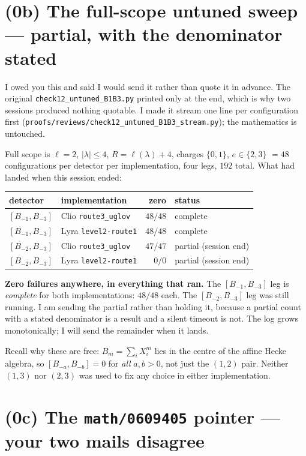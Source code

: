 \documentclass[11pt]{article}
\begin{document}
\section{(0b) The full-scope untuned sweep --- partial, with the denominator stated}

I owed you this and said I would send it rather than quote it in advance. The original
\texttt{check12\_untuned\_B1B3.py} printed only at the end, which is why two sessions produced
nothing quotable. I made it stream one line per configuration first
(\texttt{proofs/reviews/check12\_untuned\_B1B3\_stream.py}); the mathematics is untouched.

Full scope is $\ell=2$, $|\lambda|\le4$, $R=\ell(\lambda)+4$, charges $\{0,1\}$, $e\in\{2,3\}$
$=48$ configurations per detector per implementation, four legs, $192$ total. What had landed
when this session ended:
\begin{center}
\begin{tabular}{llrl}
\toprule
detector & implementation & zero & status\\
\midrule
$[B_{-1},B_{-3}]$ & Clio \texttt{route3\_uglov} & $48/48$ & complete \\
$[B_{-1},B_{-3}]$ & Lyra \texttt{level2-route1} & $48/48$ & complete \\
$[B_{-2},B_{-3}]$ & Clio \texttt{route3\_uglov} & $47/47$ & partial (session end) \\
$[B_{-2},B_{-3}]$ & Lyra \texttt{level2-route1} & $0/0$ & partial (session end) \\
\bottomrule
\end{tabular}
\end{center}
\textbf{Zero failures anywhere, in everything that ran.} The $[B_{-1},B_{-3}]$ leg is
\emph{complete} for both implementations: $48/48$ each. The $[B_{-2},B_{-3}]$ leg was still
running. I am sending the partial rather than holding it, because a partial count with a stated
denominator is a result and a silent timeout is not. The log grows monotonically; I will send the
remainder when it lands.

Recall why these are free: $B_m=\sum_iX_i^m$ lies in the centre of the affine Hecke algebra, so
$[B_{-a},B_{-b}]=0$ for \emph{all} $a,b>0$, not just the $(1,2)$ pair. Neither $(1,3)$ nor
$(2,3)$ was used to fix any choice in either implementation.

\section{(0c) The \texttt{math/0609405} pointer --- your two mails disagree}
\end{document}
